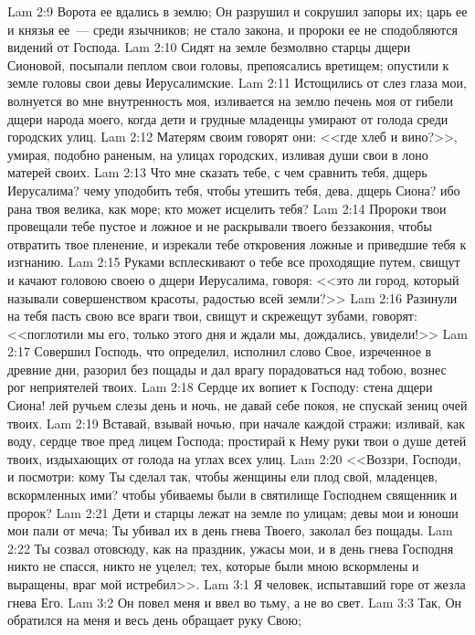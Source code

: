 \vs Lam 2:9 Ворота ее вдались в землю; Он разрушил и сокрушил запоры их; царь ее и князья ее~--- среди язычников; не стало закона, и пророки ее не сподобляются видений от Господа.
\vs Lam 2:10 Сидят на земле безмолвно старцы дщери Сионовой, посыпали пеплом свои головы, препоясались вретищем; опустили к земле головы свои девы Иерусалимские.
\vs Lam 2:11 Истощились от слез глаза мои, волнуется во мне внутренность моя, изливается на землю печень моя от гибели дщери народа моего, когда дети и грудные младенцы умирают от голода среди городских улиц.
\vs Lam 2:12 Матерям своим говорят они: <<где хлеб и вино?>>, умирая, подобно раненым, на улицах городских, изливая души свои в лоно матерей своих.
\vs Lam 2:13 Что мне сказать тебе, с чем сравнить тебя, дщерь Иерусалима? чему уподобить тебя, чтобы утешить тебя, дева, дщерь Сиона? ибо рана твоя велика, как море; кто может исцелить тебя?
\vs Lam 2:14 Пророки твои провещали тебе пустое и ложное и не раскрывали твоего беззакония, чтобы отвратить твое пленение, и изрекали тебе откровения ложные и приведшие тебя к изгнанию.
\vs Lam 2:15 Руками всплескивают о тебе все проходящие путем, свищут и качают головою своею о дщери Иерусалима, говоря: <<это ли город, который называли совершенством красоты, радостью всей земли?>>
\vs Lam 2:16 Разинули на тебя пасть свою все враги твои, свищут и скрежещут зубами, говорят: <<поглотили мы его, только этого дня и ждали мы, дождались, увидели!>>
\vs Lam 2:17 Совершил Господь, что определил, исполнил слово Свое, изреченное в древние дни, разорил без пощады и дал врагу порадоваться над тобою, вознес рог неприятелей твоих.
\vs Lam 2:18 Сердце их вопиет к Господу: стена дщери Сиона! лей ручьем слезы день и ночь, не давай себе покоя, не спускай зениц очей твоих.
\vs Lam 2:19 Вставай, взывай ночью, при начале каждой стражи; изливай, как воду, сердце твое пред лицем Господа; простирай к Нему руки твои о душе детей твоих, издыхающих от голода на углах всех улиц.
\vs Lam 2:20 <<Воззри, Господи, и посмотри: кому Ты сделал так, чтобы женщины ели плод свой, младенцев, вскормленных ими? чтобы убиваемы были в святилище Господнем священник и пророк?
\vs Lam 2:21 Дети и старцы лежат на земле по улицам; девы мои и юноши мои пали от меча; Ты убивал их в день гнева Твоего, заколал без пощады.
\vs Lam 2:22 Ты созвал отовсюду, как на праздник, ужасы мои, и в день гнева Господня никто не спасся, никто не уцелел; тех, которые были мною вскормлены и выращены, враг мой истребил>>.
\vs Lam 3:1 Я человек, испытавший горе от жезла гнева Его.
\vs Lam 3:2 Он повел меня и ввел во тьму, а не во свет.
\vs Lam 3:3 Так, Он обратился на меня и весь день обращает руку Свою;
